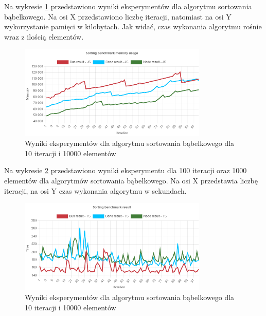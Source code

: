 Na wykresie \ref{fig:quick_sorting_e4_memory_js} przedstawiono wyniki eksperymentów dla algorytmu sortowania bąbelkowego. Na osi X przedstawiono liczbę iteracji, natomiast na osi Y wykorzystanie pamięci w kilobytach. Jak widać, czas wykonania algorytmu rośnie wraz z ilością elementów.
\begin{figure}[H]
  \centering
  \includegraphics[width=0.8\textwidth]{Figures/sorting/quick/e4_memory_js.png}
  \caption{Wyniki eksperymentów dla algorytmu sortowania bąbelkowego dla 10 iteracji i 10000 elementów}
  \label{fig:quick_sorting_e4_memory_js}
\end{figure}

Na wykresie \ref{fig:quick_sorting_e4_ts} przedstawiono wyniki eksperymentu dla 100 iteracji oraz 1000 elementów dla algorytmów sortowania bąbelkowego. Na osi X przedstawia liczbę iteracji, na osi Y czas wykonania algorytmu w sekundach. 

\begin{figure}[H]
  \centering
  \includegraphics[width=0.8\textwidth]{Figures/sorting/quick/e4_ts.png}
  \caption{Wyniki eksperymentów dla algorytmu sortowania bąbelkowego dla 10 iteracji i 10000 elementów}
  \label{fig:quick_sorting_e4_ts}
\end{figure}

